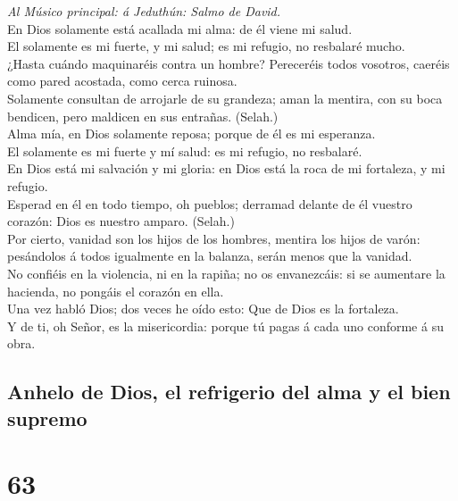  \emph{Al Músico principal: á Jeduthún: Salmo de David.}\\
En Dios solamente está acallada mi alma: de él viene mi salud.\\
 El solamente es mi fuerte, y mi salud; es mi refugio, no
resbalaré mucho.\\
 ¿Hasta cuándo maquinaréis contra un hombre? Pereceréis
todos vosotros, caeréis como pared acostada, como cerca ruinosa.\\
 Solamente consultan de arrojarle de su grandeza; aman la
mentira, con su boca bendicen, pero maldicen en sus entrañas. (Selah.)\\
 Alma mía, en Dios solamente reposa; porque de él es mi
esperanza.\\
 El solamente es mi fuerte y mí salud: es mi refugio, no
resbalaré.\\
 En Dios está mi salvación y mi gloria: en Dios está la roca
de mi fortaleza, y mi refugio.\\
 Esperad en él en todo tiempo, oh pueblos; derramad delante
de él vuestro corazón: Dios es nuestro amparo. (Selah.)\\
 Por cierto, vanidad son los hijos de los hombres, mentira
los hijos de varón: pesándolos á todos igualmente en la balanza, serán
menos que la vanidad.\\
 No confiéis en la violencia, ni en la rapiña; no os
envanezcáis: si se aumentare la hacienda, no pongáis el corazón en
ella.\\
 Una vez habló Dios; dos veces he oído esto: Que de Dios es
la fortaleza.\\
 Y de ti, oh Señor, es la misericordia: porque tú pagas á
cada uno conforme á su obra.

\hypertarget{anhelo-de-dios-el-refrigerio-del-alma-y-el-bien-supremo}{%
\subsection{Anhelo de Dios, el refrigerio del alma y el bien
supremo}\label{anhelo-de-dios-el-refrigerio-del-alma-y-el-bien-supremo}}

\hypertarget{section-62}{%
\section{63}\label{section-62}}

